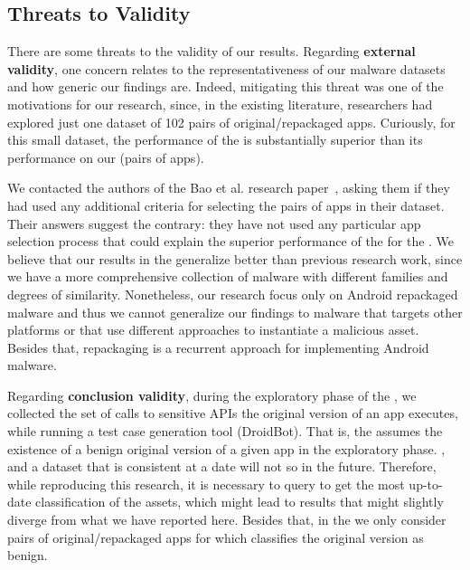 \subsection{Threats to Validity}\label{sec:threats}


There are some threats to the validity of our results.
Regarding {\bf external validity}, one concern relates to the 
representativeness of our malware datasets and how generic our findings are.
Indeed, mitigating this threat was one of the motivations for our research,
since, in the existing literature, researchers had explored just
one dataset of 102 pairs of original/repackaged apps. Curiously,
for this small dataset, the performance of the
\mas is substantially superior
than its performance on our \cds (\apps pairs of
apps).

We contacted the authors of the Bao et al. research paper~\cite{DBLP:conf/wcre/BaoLL18}, asking them
if they had used any additional criteria for selecting the pairs of apps in their
dataset. Their answers suggest the contrary: they have not used
any particular app selection process that
could explain the superior performance of the \mas for the \sds. We believe that
our results in the \cds generalize better than previous research work,
since we have a more comprehensive collection of malware with different
families and degrees of similarity. Nonetheless, our
research focus only on Android repackaged malware and thus we cannot generalize
our findings to malware that targets other platforms or that use different approaches
to instantiate a malicious asset. Besides that, repackaging is a recurrent approach
for implementing Android malware.

Regarding {\bf conclusion validity}, during the exploratory phase of the \mas, we collected the set of calls to sensitive APIs the original version of
an app executes, while running a test case generation tool (DroidBot).
That is, the \mas assumes the existence of a benign original
version of a given app in the exploratory phase. , and a dataset that is consistent at a date will
not so in the future.
Therefore, while reproducing this research, it is necessary to query \vt to get the most up-to-date classification of the assets, which might lead to results that might slightly
diverge from what we have reported here. Besides that, in the \cds we only consider
pairs of original/repackaged apps for which \vt classifies the original version as benign. 

